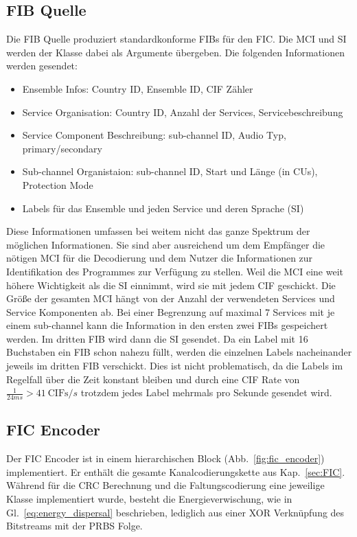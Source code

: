 \subsection{FIB Quelle}
Die FIB Quelle produziert standardkonforme FIBs für den FIC. Die \ac{MCI} und \ac{SI} werden der Klasse dabei als Argumente übergeben. Die folgenden Informationen werden gesendet:
\begin{itemize}
\item Ensemble Infos: Country ID, Ensemble ID, CIF Zähler
\item Service Organisation: Country ID, Anzahl der Services, Servicebeschreibung
\item Service Component Beschreibung: sub-channel ID, Audio Typ, primary/secondary
\item Sub-channel Organistaion: sub-channel ID, Start und Länge (in CUs), Protection Mode
\item Labels für das Ensemble und jeden Service und deren Sprache (SI)
\end{itemize}
Diese Informationen umfassen bei weitem nicht das ganze Spektrum der möglichen Informationen. Sie sind aber ausreichend um dem Empfänger die nötigen MCI für die Decodierung und dem Nutzer die Informationen zur Identifikation des Programmes zur Verfügung zu stellen. Weil die MCI eine weit höhere Wichtigkeit als die SI einnimmt, wird sie mit jedem CIF geschickt. Die Größe der gesamten MCI hängt von der Anzahl der verwendeten Services und Service Komponenten ab. Bei einer Begrenzung auf maximal 7 Services mit je einem sub-channel kann die Information in den ersten zwei FIBs gespeichert werden. Im dritten FIB wird dann die SI gesendet. Da ein Label mit 16 Buchstaben ein FIB schon nahezu füllt, werden die einzelnen Labels nacheinander jeweils im dritten FIB verschickt. Dies ist nicht problematisch, da die Labels im Regelfall über die Zeit konstant bleiben und durch eine CIF Rate von $\frac{1}{24 ms} > 41 \: \text{CIFs}/s$ trotzdem jedes Label mehrmals pro Sekunde gesendet wird. 

\subsection{FIC Encoder}
\label{sec:fic_encoder}
Der FIC Encoder ist in einem hierarchischen Block (Abb.~\ref{fig:fic_encoder}) implementiert. Er enthält die gesamte Kanalcodierungskette aus Kap.~\ref{sec:FIC}. Während für die CRC Berechnung und die Faltungscodierung eine jeweilige Klasse implementiert wurde, besteht die Energieverwischung, wie in Gl.~\ref{eq:energy_dispersal} beschrieben, lediglich aus einer XOR Verknüpfung des Bitstreams mit der PRBS Folge.


